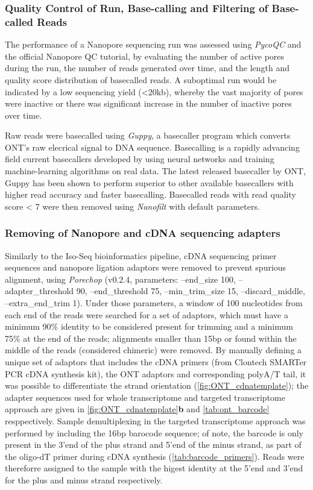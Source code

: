 \subsubsection{Quality Control of Run, Base-calling and Filtering of Base-called Reads}
The performance of a Nanopore sequencing run was assessed using \textit{PycoQC}\cite{Leger2019} and the official Nanopore QC tutorial\cite{ONT2019NanoporeQC}, by evaluating the number of active pores during the run, the number of reads generated over time, and the length and quality score distribution of basecalled reads. A suboptimal run would be indicated by a low sequencing yield (<20kb), whereby the vast majority of pores were inactive or there was significant increase in the number of inactive pores over time. 

Raw reads were basecalled using \textit{Guppy}, a basecaller program which converts ONT's raw elecrical signal to DNA sequence. Basecalling is a rapidly advancing field current basecallers developed by using neural networks and training machine-learning algorithms on real data\cite{Wick2019}. The latest released basecaller by ONT, Guppy has been shown to perform superior to other available basecallers with higher read accuracy and faster basecalling\cite{Wick2019}. Basecalled reads with read quality score < 7 were then removed using \textit{Nanofilt}\cite{DeCoster2018} with default parameters. 


\subsubsection{Removing of Nanopore and cDNA sequencing adapters}
Similarly to the Iso-Seq bioinformatics pipeline, cDNA sequencing primer sequences and nanopore ligation adaptors were removed to prevent spurious alignment, using \textit{Porechop}\cite{Wick2017} (v0.2.4, parameters: --end\_size 100, --adapter\_threshold 90, --end\_threshold 75, --min\_trim\_size 15, --discard\_middle, --extra\_end\_trim 1). Under those parameters, a window of 100 nucleotides from each end of the reads were searched for a set of adaptors, which must have a minimum 90\% identity to be considered present for trimming and a minimum 75\% at the end of the reads; alignments smaller than 15bp or found within the middle of the reads (considered chimeric) were removed. By manually defining a unique set of adaptors that includes the cDNA primers (from Clontech SMARTer PCR cDNA synthesis kit), the ONT adaptors and corresponding polyA/T tail, it was possible to differentiate the strand orientation (\cref{fig:ONT_cdnatemplate}); the adapter sequences used for whole transcriptome and targeted transcriptome approach are given in \cref{fig:ONT_cdnatemplate}\textbf{b} and \cref{tab:ont_barcode} resppectively. Sample demultiplexing in the targeted transcriptome approach was performed by including the 16bp barocode sequence; of note, the barcode is only present in the 3'end of the plus strand and 5'end of the minus strand, as part of the oligo-dT primer during cDNA synthesis (\cref{tab:barcode_primers}). Reads were thereforre assigned to the sample with the higest identity at the 5'end and 3'end for the plus and minus strand respectively. 

